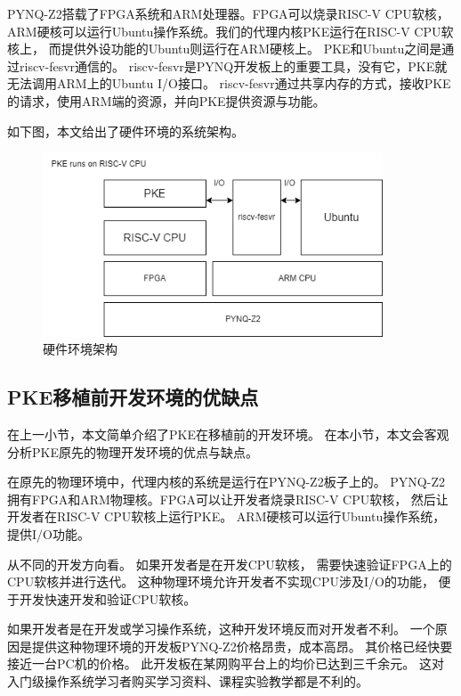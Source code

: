 PYNQ-Z2搭载了FPGA系统和ARM处理器\cite{2019Research}。FPGA可以烧录RISC-V CPU软核，
ARM硬核可以运行Ubuntu操作系统。我们的代理内核PKE运行在RISC-V CPU软核上，
而提供外设功能的Ubuntu则运行在ARM硬核上。
PKE和Ubuntu之间是通过riscv-fesvr通信的。
riscv-fesvr是PYNQ开发板上的重要工具，没有它，PKE就无法调用ARM上的Ubuntu I/O接口。
riscv-fesvr通过共享内存的方式，接收PKE的请求，使用ARM端的资源，并向PKE提供资源与功能。

如下图，本文给出了硬件环境的系统架构。

\begin{figure}[htbp]
    \vspace{13pt} %
    \centering
    \includegraphics[width=0.9\textwidth]{images/pke_hardware_env.drawio.png}
    \caption{硬件环境架构}\label{硬件环境架构} %
\end{figure}

\subsection{PKE移植前开发环境的优缺点}

在上一小节，本文简单介绍了PKE在移植前的开发环境。
在本小节，本文会客观分析PKE原先的物理开发环境的优点与缺点。

在原先的物理环境中，代理内核的系统是运行在PYNQ-Z2板子上的。
PYNQ-Z2拥有FPGA和ARM物理核。FPGA可以让开发者烧录RISC-V CPU软核，
然后让开发者在RISC-V CPU软核上运行PKE。
ARM硬核可以运行Ubuntu操作系统，提供I/O功能\cite{1996Computer}。

从不同的开发方向看。
如果开发者是在开发CPU软核，
需要快速验证FPGA上的CPU软核并进行迭代。
这种物理环境允许开发者不实现CPU涉及I/O的功能，
便于开发快速开发和验证CPU软核。

如果开发者是在开发或学习操作系统，这种开发环境反而对开发者不利。
一个原因是提供这种物理环境的开发板PYNQ-Z2价格昂贵，成本高昂。
其价格已经快要接近一台PC机的价格。
此开发板在某网购平台上的均价已达到三千余元。
这对入门级操作系统学习者购买学习资料、课程实验教学都是不利的。

